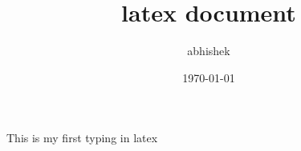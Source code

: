 \documentclass[12pt]{article}
\title{latex document}
\author{abhishek}
\date{\today}
\begin{document}
\maketitle
This is my first typing in latex
\end{document}
